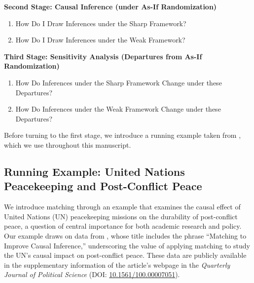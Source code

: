 \documentclass[twoside,11pt]{article}
\def\tightlist{}
\begin{document}
\textbf{Second Stage: Causal Inference (under As-If Randomization)}

\begin{enumerate}
\def\labelenumi{(\alph{enumi})}
\tightlist
\item
  How Do I Draw Inferences under the Sharp Framework?
\item
  How Do I Draw Inferences under the Weak Framework?
\end{enumerate}

\textbf{Third Stage: Sensitivity Analysis (Departures from As-If
Randomization)}

\begin{enumerate}
\def\labelenumi{(\alph{enumi})}
\tightlist
\item
  How Do Inferences under the Sharp Framework Change under these
  Departures?
\item
  How Do Inferences under the Weak Framework Change under these
  Departures?
\end{enumerate}

Before turning to the first stage, we introduce a running example taken from
\citet{gilligansergenti2008}, which we use throughout this manuscript.

\subsection{Running Example: United Nations Peacekeeping and
Post-Conflict
Peace}\label{running-example-united-nations-peacekeeping-and-post-conflict-peace}

We introduce matching through an example that examines the causal effect
of United Nations (UN) peacekeeping missions on the durability of
post-conflict peace, a question of central importance for both academic
research and policy. Our example draws on data from
\citet{gilligansergenti2008}, whose title includes the phrase ``Matching
to Improve Causal Inference,'' underscoring the value of applying
matching to study the UN's causal impact on post-conflict peace. These
data are publicly available in the supplementary information of the
article's webpage in the \emph{Quarterly Journal of Political Science}
(DOI:
\href{https://doi.org/10.1561/100.00007051}{10.1561/100.00007051}).
\end{document}
